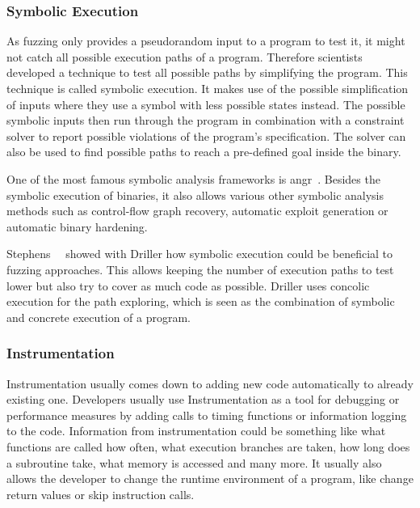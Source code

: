 \subsubsection{Symbolic Execution}

As fuzzing only provides a pseudorandom input to a program to test it, it might
not catch all possible execution paths of a program. Therefore scientists
developed a technique to test all possible paths by simplifying the program.
This technique is called symbolic execution. It makes use of the possible
simplification of inputs where they use a symbol with less possible states
instead. The possible symbolic inputs then run through the program in
combination with a constraint solver to report possible violations of the
program's specification. The solver can also be used to find possible paths to
reach a pre-defined goal inside the binary.

One of the most famous symbolic analysis frameworks is angr~\cite{angrpaper}.
Besides the symbolic execution of binaries, it also allows various other
symbolic analysis methods such as control-flow graph recovery, automatic exploit
generation or automatic binary hardening.

Stephens~\etal~\cite{driller} showed with Driller how symbolic execution could
be beneficial to fuzzing approaches. This allows keeping the number of execution
paths to test lower but also try to cover as much code as possible. Driller uses
concolic execution for the path exploring, which is seen as the combination of
symbolic and concrete execution of a program.

\subsubsection{Instrumentation}

Instrumentation usually comes down to adding new code automatically to already
existing one. Developers usually use Instrumentation as a tool for debugging or
performance measures by adding calls to timing functions or information logging
to the code. Information from instrumentation could be something like what
functions are called how often, what execution branches are taken, how long does
a subroutine take, what memory is accessed and many more. It usually also allows
the developer to change the runtime environment of a program, like change return
values or skip instruction calls.

